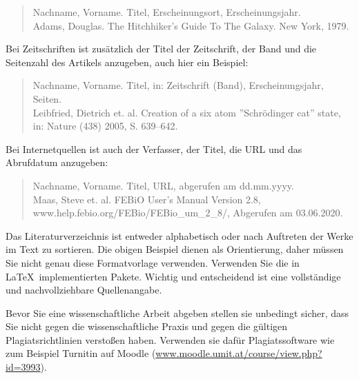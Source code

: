 \begin{quote}
Nachname, Vorname. Titel, Erscheinungsort, Erscheinungsjahr. \\
Adams, Douglas. The Hitchhiker's Guide To The Galaxy. New York, 1979.
\end{quote}

Bei Zeitschriften ist zusätzlich der Titel der Zeitschrift, der Band und die Seitenzahl des Artikels  anzugeben, auch hier ein Beispiel: 
\begin{quote}
Nachname, Vorname. Titel, in: Zeitschrift (Band), Erscheinungsjahr, Seiten. \\
Leibfried, Dietrich et. al. Creation of a six atom ''Schrödinger cat'' state, in: Nature (438) 2005, S. 639–642.
\end{quote}
Bei Internetquellen ist auch der Verfasser, der Titel, die URL und das Abrufdatum anzugeben: 
\begin{quote}
Nachname, Vorname. Titel, URL, abgerufen am dd.mm.yyyy.  \\
Maas, Steve et. al. FEBiO User’s Manual Version 2.8, www.help.febio.org/FEBio/FEBio\_um\_2\_8/, Abgerufen am 03.06.2020. 
\end{quote} 
Das Literaturverzeichnis ist entweder alphabetisch oder nach Auftreten der Werke im Text zu sortieren. 
Die obigen Beispiel dienen als Orientierung, daher müssen Sie nicht genau diese Formatvorlage verwenden. Verwenden Sie die in \LaTeX \ implementierten Pakete. Wichtig und entscheidend ist eine vollständige und nachvollziehbare Quellenangabe. 

Bevor Sie eine wissenschaftliche Arbeit abgeben stellen sie unbedingt sicher, dass Sie nicht gegen die wissenschaftliche Praxis und gegen die gültigen Plagiatsrichtlinien verstoßen haben. Verwenden sie dafür Plagiatssoftware wie zum Beispiel Turnitin auf Moodle (\href{https://moodle.umit.at/course/view.php?id=3993}{www.moodle.umit.at/course/view.php?id=3993}). 
